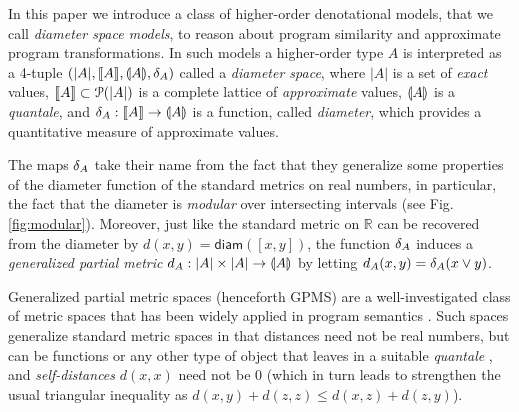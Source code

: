 In this paper we introduce a class of higher-order denotational models, that we call \emph{diameter space models}, to reason about program similarity and approximate program transformations.
In such models a higher-order type $A$ is interpreted as a 4-tuple $(|A|, \llbracket A \rrbracket, \llparenthesis A \rrparenthesis, \delta_{A})$ called a \emph{diameter space}, where $|A|$ is a set of \emph{exact} values, $\llbracket A \rrbracket\subset \mathcal P(|A|)$ is a complete lattice of \emph{approximate} values, $\llparenthesis A \rrparenthesis$ is a \emph{quantale}, and $\delta_{A}: \llbracket A \rrbracket\to \llparenthesis A \rrparenthesis$ is a function, called \emph{diameter}, which provides a quantitative measure of approximate values.





The maps $\delta_{A}$ take their name from the fact that they  
 generalize some properties of the diameter function of the standard metrics on real numbers, in particular, 
the fact that the diameter is \emph{modular} over intersecting intervals (see Fig. \ref{fig:modular}).
Moreover, just like the standard metric on $\mathbb R$ can be recovered from the diameter by $d(x,y)=\mathsf{diam}([x,y])$, the function $\delta_{A}$ induces a \emph{generalized partial metric} $d_{A}:|A|\times |A|\to \llparenthesis A \rrparenthesis$ by letting $d_{A}(x,y)=\delta_{A}(x\vee y)$. 


Generalized partial metric spaces (henceforth GPMS) are a well-investigated class of metric spaces that has been widely applied in program semantics \cite{bkmp:partial-metrics, Bukatin1997, doi:10.1111/j.1749-6632.1994.tb44144.x, Schellekens2004, Samet:2013aa, Stubbe2018, HE201999}. 
Such spaces generalize standard metric spaces in that distances
need not be real numbers, but can be functions or any other type of object that leaves in a suitable \emph{quantale} \cite{Hofmann2014}, and \emph{self-distances} $d(x,x)$ need not be $0$ (which in turn leads to strengthen the usual triangular inequality as $d(x,y) + d(z,z)\leq d(x,z)+d(z,y)$).


